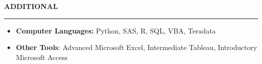 \documentclass[11pt,letterpaper]{article}
\newcommand{\sectline}{\vspace{5pt}\hrule height 1.5pt\vspace{5pt}}
\begin{document}
\textbf{ADDITIONAL}\sectline
\begin{itemize}
	\item \textbf{Computer Languages:} Python, SAS, R, SQL, VBA, Teradata
	\item \textbf{Other Tools}: Advanced Microsoft Excel, Intermediate Tableau, Introductory Microsoft Access
\end{itemize}
\end{document}
